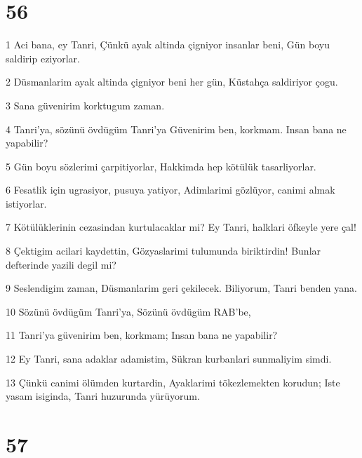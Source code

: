 \chapter{56}

\par 1 Aci bana, ey Tanri, Çünkü ayak altinda çigniyor insanlar beni, Gün boyu saldirip eziyorlar.
\par 2 Düsmanlarim ayak altinda çigniyor beni her gün, Küstahça saldiriyor çogu.
\par 3 Sana güvenirim korktugum zaman.
\par 4 Tanri'ya, sözünü övdügüm Tanri'ya Güvenirim ben, korkmam. Insan bana ne yapabilir?
\par 5 Gün boyu sözlerimi çarpitiyorlar, Hakkimda hep kötülük tasarliyorlar.
\par 6 Fesatlik için ugrasiyor, pusuya yatiyor, Adimlarimi gözlüyor, canimi almak istiyorlar.
\par 7 Kötülüklerinin cezasindan kurtulacaklar mi? Ey Tanri, halklari öfkeyle yere çal!
\par 8 Çektigim acilari kaydettin, Gözyaslarimi tulumunda biriktirdin! Bunlar defterinde yazili degil mi?
\par 9 Seslendigim zaman, Düsmanlarim geri çekilecek. Biliyorum, Tanri benden yana.
\par 10 Sözünü övdügüm Tanri'ya, Sözünü övdügüm RAB'be,
\par 11 Tanri'ya güvenirim ben, korkmam; Insan bana ne yapabilir?
\par 12 Ey Tanri, sana adaklar adamistim, Sükran kurbanlari sunmaliyim simdi.
\par 13 Çünkü canimi ölümden kurtardin, Ayaklarimi tökezlemekten korudun; Iste yasam isiginda, Tanri huzurunda yürüyorum.

\chapter{57}

